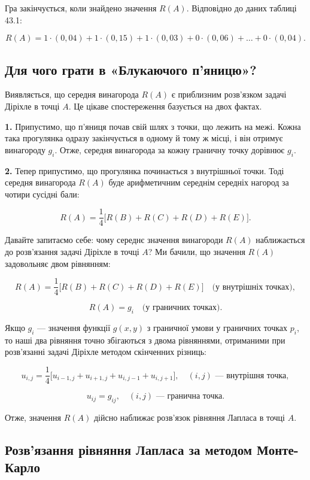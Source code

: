 \documentclass[
  ukrainian,
]{article}
\begin{document}
Гра закінчується, коли знайдено значення \(R(A)\). Відповідно до даних
таблиці 43.1:

\[R(A) = 1\cdot(0{,}04) + 1\cdot(0{,}15) + 1\cdot(0{,}03) + 0\cdot(0{,}06) + \dots + 0\cdot(0{,}04).\]

\subsection{Для чого грати в «Блукаючого
п'яницю»?}\label{ux434ux43bux44f-ux447ux43eux433ux43e-ux433ux440ux430ux442ux438-ux432-ux431ux43bux443ux43aux430ux44eux447ux43eux433ux43e-ux43fux44fux43dux438ux446ux44e}

Виявляється, що середня винагорода \(R(A)\) є приблизним розв'язком
задачі Діріхле в точці \(A\). Це цікаве спостереження базується на двох
фактах.

\textbf{1.} Припустимо, що п'яниця почав свій шлях з точки, що лежить на
межі. Кожна така прогулянка одразу закінчується в одному й тому ж місці,
і він отримує винагороду \(g_i\). Отже, середня винагорода за кожну
граничну точку дорівнює \(g_i\).

\textbf{2.} Тепер припустимо, що прогулянка починається з внутрішньої
точки. Тоді середня винагорода \(R(A)\) буде арифметичним середнім
середніх нагород за чотири сусідні бали:

\[R(A) = \frac{1}{4}\bigl[R(B) + R(C) + R(D) + R(E)\bigr].\]

Давайте запитаємо себе: чому середнє значення винагороди \(R(A)\)
наближається до розв'язання задачі Діріхле в точці \(A\)? Ми бачили, що
значення \(R(A)\) задовольняє двом рівнянням:

\[R(A) = \frac{1}{4}\bigl[R(B) + R(C) + R(D) + R(E)\bigr] \quad \text{(у внутрішніх точках)},\]

\[R(A) = g_i \quad \text{(у граничних точках)}.\]

Якщо \(g_i\) --- значення функції \(g(x, y)\) з граничної умови у
граничних точках \(p_i\), то наші два рівняння точно збігаються з двома
рівняннями, отриманими при розв'язанні задачі Діріхле методом скінченних
різниць:

\[u_{i,j} = \frac{1}{4}\bigl[u_{i-1,j} + u_{i+1,j} + u_{i,j-1} + u_{i,j+1}\bigr], \quad (i,j) \text{ — внутрішня точка},\]

\[u_{ij} = g_{ij}, \quad (i,j) \text{ — гранична точка}.\]

Отже, значення \(R(A)\) дійсно наближає розв'язок рівняння Лапласа в
точці \(A\).

\subsection{Розв'язання рівняння Лапласа за методом
Монте-Карло}\label{ux440ux43eux437ux432ux44fux437ux430ux43dux43dux44f-ux440ux456ux432ux43dux44fux43dux43dux44f-ux43bux430ux43fux43bux430ux441ux430-ux437ux430-ux43cux435ux442ux43eux434ux43eux43c-ux43cux43eux43dux442ux435-ux43aux430ux440ux43bux43e}
\end{document}
